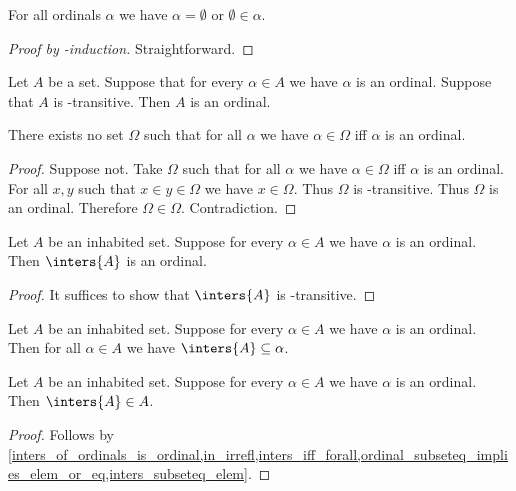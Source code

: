 \begin{proposition}\label{ordinal_empty_or_emptyset_elem}
    For all ordinals $\alpha$
    we have $\alpha=\emptyset$ or $\emptyset\in\alpha$.
\end{proposition}
\begin{proof}[Proof by \in-induction]
    Straightforward.
\end{proof}

\begin{proposition}\label{transitive_set_of_ordinals_is_ordinal}
    Let $A$ be a set.
    Suppose that for every $\alpha\in A$ we have $\alpha$ is an ordinal.
    Suppose that $A$ is \in-transitive.
    Then $A$ is an ordinal.
\end{proposition}

\begin{theorem}\label{buraliforti_antinomy}
    There exists no set $\Omega$ such that
    for all $\alpha$ we have $\alpha\in \Omega$ iff $\alpha$ is an ordinal.
\end{theorem}
\begin{proof}
    Suppose not.
    Take $\Omega$ such that for all $\alpha$ we have $\alpha\in \Omega$ iff $\alpha$ is an ordinal.
    For all $x, y$ such that $x\in y\in \Omega$ we have $x\in \Omega$.
    Thus $\Omega$ is \in-transitive.
    Thus $\Omega$ is an ordinal.
    Therefore $\Omega\in\Omega$.
    Contradiction.
\end{proof}

\begin{proposition}\label{inters_of_ordinals_is_ordinal}
    Let $A$ be an inhabited set.
    Suppose for every $\alpha\in A$ we have $\alpha$ is an ordinal.
    Then $\inters{A}$ is an ordinal.
\end{proposition}
\begin{proof}
    It suffices to show that $\inters{A}$ is \in-transitive.
\end{proof}

\begin{proposition}\label{inters_of_ordinals_subseteq}
    Let $A$ be an inhabited set.
    Suppose for every $\alpha\in A$ we have $\alpha$ is an ordinal.
    Then for all $\alpha\in A$ we have $\inters{A}\subseteq \alpha$.
\end{proposition}

\begin{proposition}\label{inters_of_ordinals_elem}
    Let $A$ be an inhabited set.
    Suppose for every $\alpha\in A$ we have $\alpha$ is an ordinal.
    Then $\inters{A}\in A$.
\end{proposition}
\begin{proof}
    Follows by \cref{inters_of_ordinals_is_ordinal,in_irrefl,inters_iff_forall,ordinal_subseteq_implies_elem_or_eq,inters_subseteq_elem}.
\end{proof}

